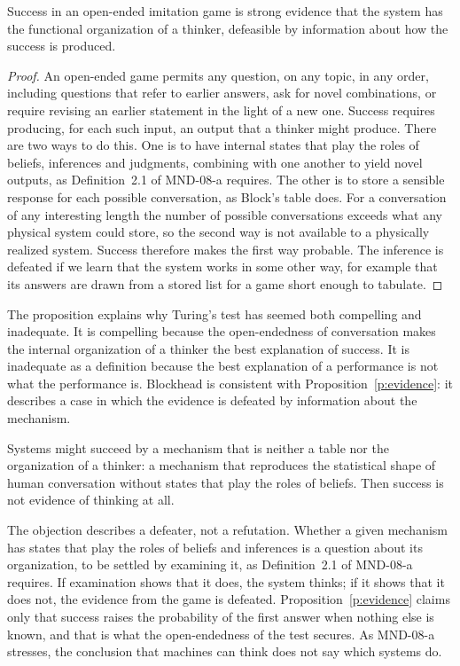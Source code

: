 \documentclass{situationist-preprint}
\begin{document}
\begin{proposition}\label{p:evidence}
Success in an open-ended imitation game is strong evidence that the system has the functional organization of a thinker, defeasible by information about how the success is produced.
\end{proposition}

\begin{proof}
An open-ended game permits any question, on any topic, in any order, including questions that refer to earlier answers, ask for novel combinations, or require revising an earlier statement in the light of a new one. Success requires producing, for each such input, an output that a thinker might produce. There are two ways to do this. One is to have internal states that play the roles of beliefs, inferences and judgments, combining with one another to yield novel outputs, as Definition~2.1 of MND-08-a requires. The other is to store a sensible response for each possible conversation, as Block's table does. For a conversation of any interesting length the number of possible conversations exceeds what any physical system could store, so the second way is not available to a physically realized system. Success therefore makes the first way probable. The inference is defeated if we learn that the system works in some other way, for example that its answers are drawn from a stored list for a game short enough to tabulate.
\end{proof}

The proposition explains why Turing's test has seemed both compelling and inadequate. It is compelling because the open-endedness of conversation makes the internal organization of a thinker the best explanation of success. It is inadequate as a definition because the best explanation of a performance is not what the performance is. Blockhead is consistent with Proposition~\ref{p:evidence}: it describes a case in which the evidence is defeated by information about the mechanism.

\begin{objection}
Systems might succeed by a mechanism that is neither a table nor the organization of a thinker: a mechanism that reproduces the statistical shape of human conversation without states that play the roles of beliefs. Then success is not evidence of thinking at all.
\end{objection}

\begin{reply}
The objection describes a defeater, not a refutation. Whether a given mechanism has states that play the roles of beliefs and inferences is a question about its organization, to be settled by examining it, as Definition~2.1 of MND-08-a requires. If examination shows that it does, the system thinks; if it shows that it does not, the evidence from the game is defeated. Proposition~\ref{p:evidence} claims only that success raises the probability of the first answer when nothing else is known, and that is what the open-endedness of the test secures. As MND-08-a stresses, the conclusion that machines can think does not say which systems do.
\end{reply}
\end{document}
